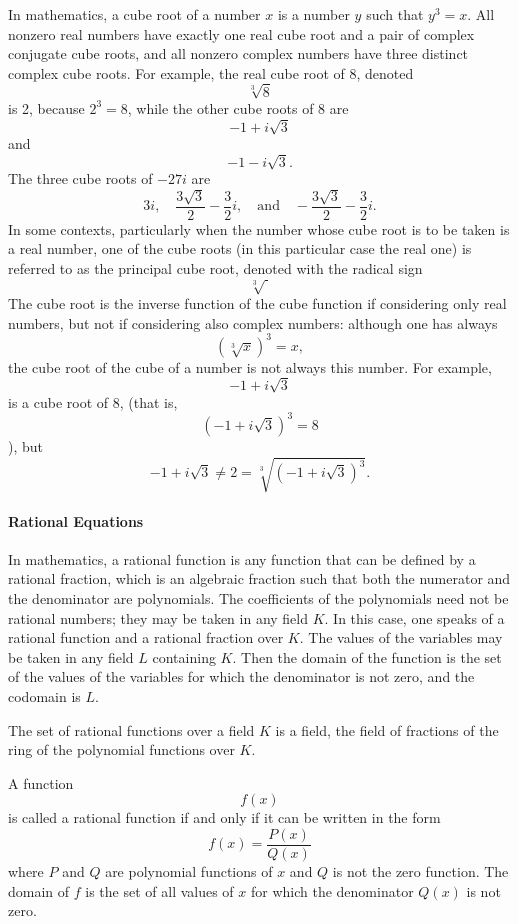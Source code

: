 In mathematics, a cube root of a number $x$ is a number $y$ such that $y^3 = x$. All nonzero real numbers have exactly one real cube root and a pair of complex conjugate cube roots, and all nonzero complex numbers have three distinct complex cube roots. For example, the real cube root of 8, denoted 
$$
\sqrt[3]{8}
$$
is 2, because $2^3 = 8$, while the other cube roots of 8 are 
$$
-1 + i\sqrt{3}
$$
and 
$$
-1 - i\sqrt{3}.
$$
The three cube roots of $-27i$ are
$$
3i,\quad \frac{3\sqrt{3}}{2} - \frac{3}{2}i,\quad \text{and}\quad -\frac{3\sqrt{3}}{2} - \frac{3}{2}i.
$$
In some contexts, particularly when the number whose cube root is to be taken is a real number, one of the cube roots (in this particular case the real one) is referred to as the principal cube root, denoted with the radical sign 
$$
\sqrt[3]{~}
$$
The cube root is the inverse function of the cube function if considering only real numbers, but not if considering also complex numbers: although one has always
$$
\left(\sqrt[3]{x}\right)^3 = x,
$$
the cube root of the cube of a number is not always this number. For example,
$$
-1 + i\sqrt{3}
$$
is a cube root of 8, (that is,
$$
(-1 + i\sqrt{3})^3 = 8
$$
), but
$$
-1 + i\sqrt{3} \neq 2 = \sqrt[3]{(-1 + i\sqrt{3})^3}.
$$
\paragraph{Rational Equations}

In mathematics, a rational function is any function that can be defined by a rational fraction, which is an algebraic fraction such that both the numerator and the denominator are polynomials. The coefficients of the polynomials need not be rational numbers; they may be taken in any field $K$. In this case, one speaks of a rational function and a rational fraction over $K$. The values of the variables may be taken in any field $L$ containing $K$. Then the domain of the function is the set of the values of the variables for which the denominator is not zero, and the codomain is $L$.

The set of rational functions over a field $K$ is a field, the field of fractions of the ring of the polynomial functions over $K$.

A function 
$$
f(x)
$$
is called a rational function if and only if it can be written in the form
$$
f(x) = \frac{P(x)}{Q(x)}
$$
where $P$ and $Q$ are polynomial functions of $x$ and $Q$ is not the zero function. The domain of $f$ is the set of all values of $x$ for which the denominator $Q(x)$ is not zero.

